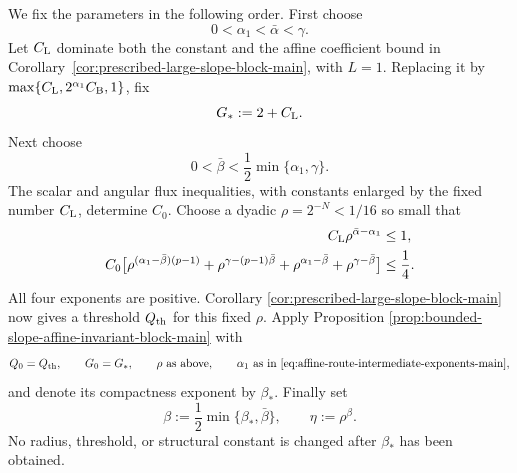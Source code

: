 \documentclass[11pt,reqno]{amsart}
\numberwithin{equation}{section}
\theoremstyle{remark}
\begin{document}
We fix the parameters in the following order.  First choose
\begin{equation}
 0<\alpha_1<\bar\alpha<\gamma.
 \label{eq:affine-route-intermediate-exponents-main}
\end{equation}
Let \(C_{\rm L}\) dominate both the constant and the affine coefficient
bound in Corollary~\ref{cor:prescribed-large-slope-block-main}, with
\(L=1\).  Replacing it by
\(\max\{C_{\rm L},2^{\alpha_1}C_{\rm B},1\}\), fix
\begin{equation}
 G_*:=2+C_{\rm L}.
 \label{eq:affine-route-campanato-budget-main}
\end{equation}
Next choose
\begin{equation}
 0<\bar\beta<\frac12\min\{\alpha_1,\gamma\}.
 \label{eq:affine-route-beta-bar-main}
\end{equation}
The scalar and angular flux inequalities, with constants enlarged by
the fixed number \(C_{\rm L}\), determine \(C_0\).  Choose a dyadic
\(\rho=2^{-N}<1/16\) so small that
\begin{align}
 C_{\rm L}\rho^{\bar\alpha-\alpha_1}&\le1,
 \label{eq:affine-route-large-endpoint-main}\\
 C_0\bigl[
 \rho^{(\alpha_1-\bar\beta)(p-1)}
 +\rho^{\gamma-(p-1)\bar\beta}
 +\rho^{\alpha_1-\bar\beta}
 +\rho^{\gamma-\bar\beta}\bigr]&\le\frac14.
 \label{eq:affine-route-tail-small-main}
\end{align}
All four exponents are positive.  Corollary
\ref{cor:prescribed-large-slope-block-main} now gives a threshold
\(Q_{\rm th}\) for this fixed \(\rho\).  Apply Proposition
\ref{prop:bounded-slope-affine-invariant-block-main} with
\[
 Q_0=Q_{\rm th},\qquad G_0=G_*,\qquad
 \rho\ \hbox{as above},\qquad
 \alpha_1\ \hbox{as in }\eqref{eq:affine-route-intermediate-exponents-main},
\]
and denote its compactness exponent by \(\beta_*\).  Finally set
\begin{equation}
 \beta:=\frac12\min\{\beta_*,\bar\beta\},
 \qquad\eta:=\rho^\beta.
 \label{eq:affine-route-final-beta-main}
\end{equation}
No radius, threshold, or structural constant is changed after
\(\beta_*\) has been obtained.
\end{document}
